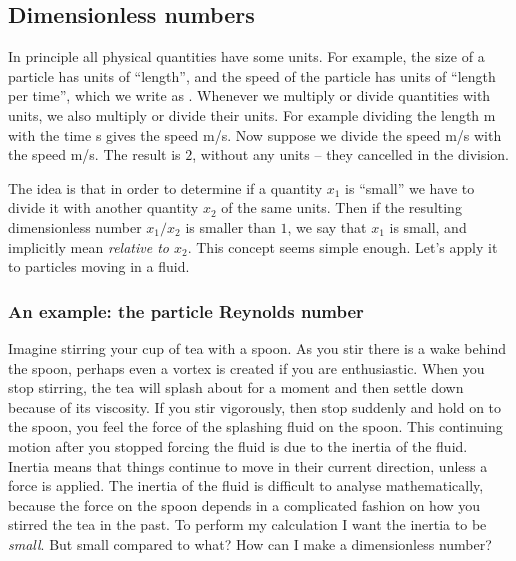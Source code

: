 \documentclass[thesis.tex]{subfiles}
\begin{document}
\subsection*{Dimensionless numbers}

In principle all physical quantities have some units. For example, the size of a particle has units of ``length'', and the speed of the particle has units of ``length per time'', which we write as . Whenever we multiply or divide quantities with units, we also multiply or divide their units. For example dividing the length \unit[20]{m} with the time \unit[5]{s} gives the speed \unit[4]{m/s}. Now suppose we divide the speed \unit[4]{m/s} with the speed \unit[2]{m/s}. The result is $2$, without any units -- they cancelled in the division.

The idea is that in order to determine if a quantity $x_1$ is ``small'' we have to divide it with another quantity $x_2$ of the same units. Then if the resulting dimensionless number $x_1/x_2$ is smaller than $1$, we say that $x_1$ is small, and implicitly mean \emph{relative to $x_2$}. This concept seems simple enough. Let's apply it to particles moving in a fluid.

\subsubsection*{An example: the particle Reynolds number}

Imagine stirring your cup of tea with a spoon. As you stir there is a wake behind the spoon, perhaps even a vortex is created if you are enthusiastic. When you stop stirring, the tea will splash about for a moment and then settle down because of its viscosity. If you stir vigorously, then stop suddenly and hold on to the spoon, you feel the force of the splashing fluid on the spoon. This continuing motion after you stopped forcing the fluid is due to the inertia of the fluid. Inertia means that things continue to move in their current direction, unless a force is applied. The inertia of the fluid is difficult to analyse mathematically, because the force on the spoon depends in a complicated fashion on how you stirred the tea in the past. To perform my calculation I want the inertia to be \emph{small}. But small compared to what? How can I make a dimensionless number?
\end{document}

